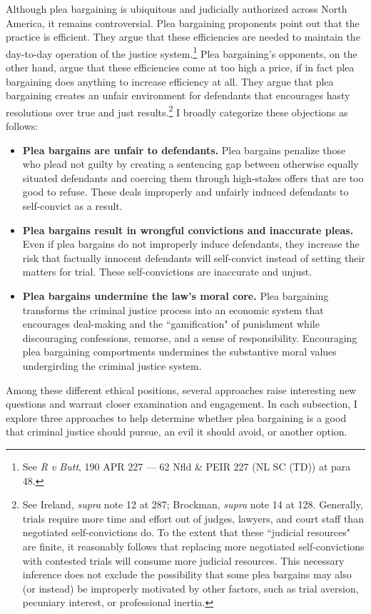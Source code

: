 Although plea bargaining is ubiquitous and judicially authorized across North America, it remains controversial. Plea bargaining proponents point out that the practice is efficient. They argue that these efficiencies are needed to maintain the day-to-day operation of the justice system.\footnote{See \textit{R v Butt}, 190 APR 227 — 62 Nfld \& PEIR 227 (NL SC (TD)) at para 48.} Plea bargaining's opponents, on the other hand, argue that these efficiencies come at too high a price, if in fact plea bargaining does anything to increase efficiency at all. They argue that plea bargaining creates an unfair environment for defendants that encourages hasty resolutions over true and just results.\footnote{See Ireland, \textit{supra} note 12 at 287; Brockman, \textit{supra} note 14 at 128. Generally, trials require more time and effort out of judges, lawyers, and court staff than negotiated self-convictions do. To the extent that these ``judicial resources" are finite, it reasonably follows that replacing more negotiated self-convictions with contested trials will consume more judicial resources. This necessary inference does not exclude the possibility that some plea bargains may also (or instead) be improperly motivated by other factors, such as trial aversion, pecuniary interest, or professional inertia.} I broadly categorize these objections as follows:

\begin{itemize}
    \item \textbf{Plea bargains are unfair to defendants.} Plea bargains penalize those who plead not guilty by creating a sentencing gap between otherwise equally situated defendants and coercing them through high-stakes offers that are too good to refuse. These deals improperly and unfairly induced defendants to self-convict as a result.
    \item \textbf{Plea bargains result in wrongful convictions and inaccurate pleas.} Even if plea bargains do not improperly induce defendants, they increase the risk that factually innocent defendants will self-convict instead of setting their matters for trial. These self-convictions are inaccurate and unjust.
    \item \textbf{Plea bargains undermine the law's moral core.} Plea bargaining transforms the criminal justice process into an economic system that encourages deal-making and the ``gamification" of punishment while discouraging confessions, remorse, and a sense of responsibility. Encouraging plea bargaining comportments undermines the substantive moral values undergirding the criminal justice system.
\end{itemize}
Among these different ethical positions, several approaches raise interesting new questions and warrant closer examination and engagement. In each subsection, I explore three approaches to help determine whether plea bargaining is a good that criminal justice should pursue, an evil it should avoid, or another option. 

